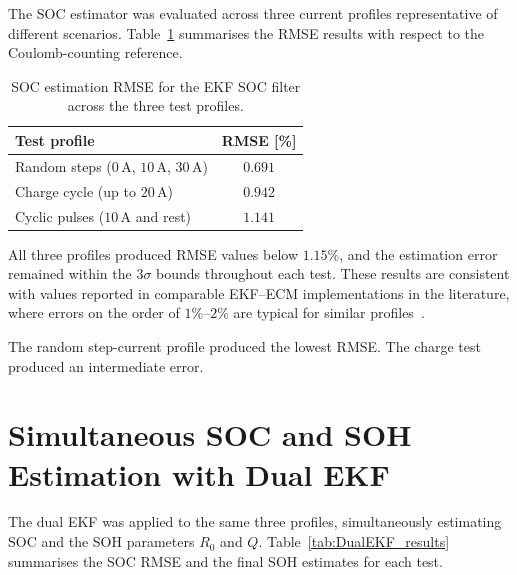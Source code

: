 The \ac{SOC} estimator was evaluated across three current profiles representative of different scenarios. 
Table~\ref{tab:SOC_RMSE} summarises the \ac{RMSE} results with respect 
to the Coulomb-counting reference.

\begin{table}[H]
    \centering
    \setlength{\arrayrulewidth}{0.7pt}
    \renewcommand{\arraystretch}{1.3} 
    \begin{tabular}{|l|c|}
        \hline
        \textbf{Test profile} & \textbf{RMSE [\%]} \\
        \hline
        Random steps ($0\,\text{A}$, $10\,\text{A}$, $30\,\text{A}$) & $0.691$ \\
        \hline
        Charge cycle (up to $20\,\text{A}$)                    & $0.942$ \\
        \hline
        Cyclic pulses ($10\,\text{A}$ and rest)                          & $1.141$ \\
        \hline
    \end{tabular}
    \caption{SOC estimation \ac{RMSE} for the \ac{EKF} \ac{SOC} filter across the three test profiles.}
    \label{tab:SOC_RMSE}
\end{table}

All three profiles produced \ac{RMSE} values below $1.15\%$, and the estimation error remained 
within the $3\sigma$ bounds throughout each test. These results are consistent with values reported 
in comparable \ac{EKF}--\ac{ECM} implementations in the literature, where errors on the order of 
$1\%$--$2\%$ are typical for similar profiles~\cite{EKFEV}\cite{BatteryKalmanRaceCar}.

The random step-current profile produced the lowest \ac{RMSE}. The charge test produced 
an intermediate error.

\section{Simultaneous SOC and SOH Estimation with Dual EKF}

The dual \ac{EKF} was applied to the same three profiles, simultaneously estimating \ac{SOC} and 
the \ac{SOH} parameters $R_0$ and $Q$. Table~\ref{tab:DualEKF_results} summarises the \ac{SOC} 
\ac{RMSE} and the final \ac{SOH} estimates for each test.

